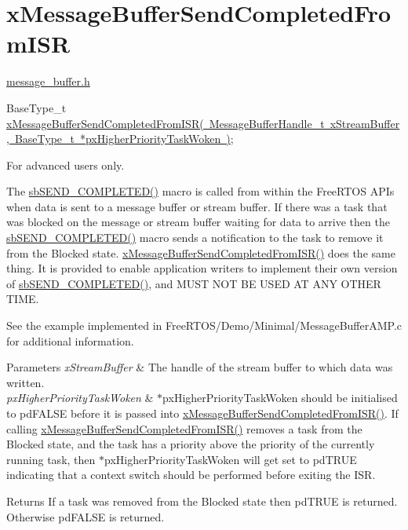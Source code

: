 \hypertarget{group__x_message_buffer_send_completed_from_i_s_r}{}\section{x\+Message\+Buffer\+Send\+Completed\+From\+I\+SR}
\label{group__x_message_buffer_send_completed_from_i_s_r}
\mbox{\hyperlink{message__buffer_8h}{message\+\_\+buffer.\+h}}


\begin{DoxyPre}
BaseType\_t \mbox{\hyperlink{message__buffer_8h_a45918d12bf530cb2b4bf21c0936460a9}{xMessageBufferSendCompletedFromISR( MessageBufferHandle\_t xStreamBuffer, BaseType\_t *pxHigherPriorityTaskWoken )}};
\end{DoxyPre}


For advanced users only.

The \mbox{\hyperlink{stream__buffer_8c_aa75273dfbcd92710254df0165ae1da5d}{sb\+S\+E\+N\+D\+\_\+\+C\+O\+M\+P\+L\+E\+T\+E\+D()}} macro is called from within the Free\+R\+T\+OS A\+P\+Is when data is sent to a message buffer or stream buffer. If there was a task that was blocked on the message or stream buffer waiting for data to arrive then the \mbox{\hyperlink{stream__buffer_8c_aa75273dfbcd92710254df0165ae1da5d}{sb\+S\+E\+N\+D\+\_\+\+C\+O\+M\+P\+L\+E\+T\+E\+D()}} macro sends a notification to the task to remove it from the Blocked state. \mbox{\hyperlink{message__buffer_8h_a45918d12bf530cb2b4bf21c0936460a9}{x\+Message\+Buffer\+Send\+Completed\+From\+I\+S\+R()}} does the same thing. It is provided to enable application writers to implement their own version of \mbox{\hyperlink{stream__buffer_8c_aa75273dfbcd92710254df0165ae1da5d}{sb\+S\+E\+N\+D\+\_\+\+C\+O\+M\+P\+L\+E\+T\+E\+D()}}, and M\+U\+ST N\+OT BE U\+S\+ED AT A\+NY O\+T\+H\+ER T\+I\+ME.

See the example implemented in Free\+R\+T\+O\+S/\+Demo/\+Minimal/\+Message\+Buffer\+A\+M\+P.\+c for additional information.


\begin{DoxyParams}{Parameters}
{\em x\+Stream\+Buffer} & The handle of the stream buffer to which data was written.\\
\hline
{\em px\+Higher\+Priority\+Task\+Woken} & $\ast$px\+Higher\+Priority\+Task\+Woken should be initialised to pd\+F\+A\+L\+SE before it is passed into \mbox{\hyperlink{message__buffer_8h_a45918d12bf530cb2b4bf21c0936460a9}{x\+Message\+Buffer\+Send\+Completed\+From\+I\+S\+R()}}. If calling \mbox{\hyperlink{message__buffer_8h_a45918d12bf530cb2b4bf21c0936460a9}{x\+Message\+Buffer\+Send\+Completed\+From\+I\+S\+R()}} removes a task from the Blocked state, and the task has a priority above the priority of the currently running task, then $\ast$px\+Higher\+Priority\+Task\+Woken will get set to pd\+T\+R\+UE indicating that a context switch should be performed before exiting the I\+SR.\\
\hline
\end{DoxyParams}
\begin{DoxyReturn}{Returns}
If a task was removed from the Blocked state then pd\+T\+R\+UE is returned. Otherwise pd\+F\+A\+L\+SE is returned. 
\end{DoxyReturn}
